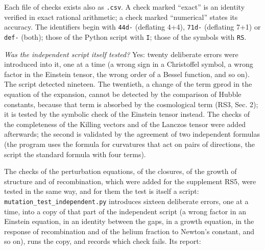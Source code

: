 \documentclass[
  10pt,
]{article}
\begin{document}
Each file of checks exists also as \texttt{.csv}. A check marked
``exact'' is an identity verified in exact rational arithmetic; a check
marked ``numerical'' states its accuracy. The identifiers begin with
\texttt{44d-} (deflating 4+4), \texttt{71d-} (deflating 7+1) or
\texttt{def-} (both); those of the Python script with \texttt{I}; those
of the symbols with \texttt{RS}.

\emph{Was the independent script itself tested?} Yes: twenty deliberate
errors were introduced into it, one at a time (a wrong sign in a
Christoffel symbol, a wrong factor in the Einstein tensor, the wrong
order of a Bessel function, and so on). The script detected nineteen.
The twentieth, a change of the term \(\mathrm{gprod}\) in the equation
of the expansion, cannot be detected by the comparison of Hubble
constants, because that term is absorbed by the cosmological term (RS3,
Sec. 2); it is tested by the symbolic check of the Einstein tensor
instead. The checks of the completeness of the Killing vectors and of
the Lanczos tensor were added afterwards; the second is validated by the
agreement of two independent formulas (the program uses the formula for
curvatures that act on pairs of directions, the script the standard
formula with four terms).

The checks of the perturbation equations, of the closures, of the growth
of structure and of recombination, which were added for the supplement
RS5, were tested in the same way, and for them the test is itself a
script: \texttt{mutation\_test\_independent.py} introduces sixteen
deliberate errors, one at a time, into a copy of that part of the
independent script (a wrong factor in an Einstein equation, in an
identity between the gaps, in a growth equation, in the response of
recombination and of the helium fraction to Newton's constant, and so
on), runs the copy, and records which check fails. Its report:
\end{document}
